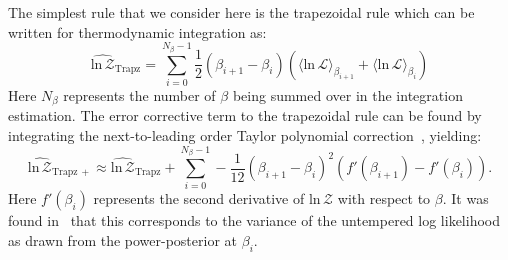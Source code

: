 The simplest rule that we consider here is the trapezoidal rule which can be written for thermodynamic integration as:
\begin{equation}
    \widehat{\mathrm{ln} \, \mathcal{Z}}_{\mathrm{Trapz}} = \sum_{i=0}^{N_\beta-1} \frac{1}{2} \left(\beta_{i+1} - \beta_i \right) \left(\langle \mathrm{ln} \, \mathcal{L} \rangle_{\beta_{i+1}} + \langle \mathrm{ln} \, \mathcal{L} \rangle_{\beta_{i}} \right)
\end{equation}
Here $N_\beta$ represents the number of $\beta$ being summed over in the integration estimation. The error corrective term to the trapezoidal rule can be found by integrating the next-to-leading order Taylor polynomial correction~\citep{abramowitz1965handbook}, yielding:
\begin{equation}
    \widehat{\mathrm{ln} \, \mathcal{Z}}_{\mathrm{Trapz \, +}} \approx \widehat{\mathrm{ln} \, \mathcal{Z}}_{\mathrm{Trapz}} + \sum_{i=0}^{N_\beta-1} -\frac{1}{12} \left(\beta_{i+1} - \beta_i \right)^2 \left(f'(\beta_{i+1}) - f'(\beta_{i}) \right).
\end{equation}
Here $f'(\beta_i)$ represents the second derivative of $\mathrm{ln} \, \mathcal{Z}$ with respect to $\beta$. It was found in~\cite{friel2014improving} that this corresponds to the variance of the untempered log likelihood as drawn from the power-posterior at $\beta_i$.

